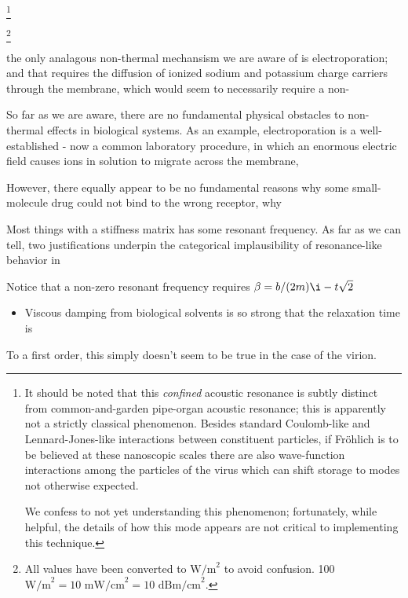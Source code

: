 \documentclass[paper.tex]{subfiles}
\begin{document}
\begin{multicols}{1}
\footnote{It should be noted that this {\it confined} acoustic resonance is subtly distinct from common-and-garden pipe-organ acoustic resonance; this is apparently not a strictly classical phenomenon. Besides standard Coulomb-like and Lennard-Jones-like interactions between constituent particles, if Fr\"{o}hlich is to be believed at these nanoscopic scales there are also wave-function interactions among the particles of the virus which can shift storage to modes not otherwise expected.
	
	We confess to not yet understanding this phenomenon; fortunately, while helpful, the details of how this mode appears are not critical to implementing this technique.}


\footnote{All values have been converted to $\text{W/m}^2$ to avoid confusion. 100 $\text{W/m}^2 = 10 \text{ mW/cm}^2 = 10 \text{ dBm/cm}^2$.}




the only analagous non-thermal mechansism we are aware of is electroporation; and that requires the diffusion of ionized sodium and potassium charge carriers through the membrane, which would seem to necessarily require a non-



So far as we are aware, there are no fundamental physical obstacles to non-thermal effects in biological systems. As an example, electroporation is a well-established - now a common laboratory procedure, in which an enormous electric field causes ions in solution to migrate across the membrane, 

However, there equally appear to be no fundamental reasons why some small-molecule drug could not bind to the wrong receptor, why 



Most things with a stiffness matrix has some resonant frequency\citationneeded. As far as we can tell, two justifications underpin the categorical implausibility of resonance-like behavior in 

Notice that a non-zero resonant frequency
requires $\beta = b/(2m) \i-t \sqrt{2}$ \cite{Driven}


\begin{itemize}
		\item Viscous damping from biological solvents is so strong that the relaxation time is 
\end{itemize}

To a first order, this simply doesn't seem to be true in the case of the virion.


\end{multicols}
\end{document}
